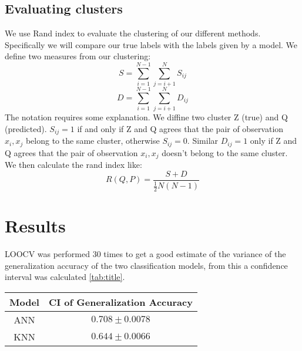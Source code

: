 \documentclass{article}
\begin{document}


\subsection*{Evaluating clusters}
We use Rand index to evaluate the clustering of our different methods. Specifically we will compare our true labels with the labels given by a model.
We define two measures from our clustering:
\begin{equation}
S=\sum_{i=1}^{N-1} \sum_{j=i+1}^{N} S_{i j}
\end{equation}
\begin{equation}
D=\sum_{i=1}^{N-1} \sum_{j=i+1}^{N} D_{i j}
\end{equation}
The notation requires some explanation. We diffine two cluster Z (true) and Q (predicted). $S_{ij} = 1$ if and only if  Z and Q agrees that the pair of observation ${x_i,x_j}$ belong to the same cluster, otherwise $S_{ij} = 0$. Similar  $D_{ij} = 1$ only if Z and Q agrees that the pair of observation ${x_i,x_j}$ doesn't belong to the same cluster. 
We then calculate the rand index like:
\begin{equation}
R(Q, P)=\frac{S+D}{\frac{1}{2} N(N-1)}
\end{equation}

\section{Results}
LOOCV was performed 30 times to get a good estimate of the variance of the generalization accuracy of the two classification models, from this a confidence interval was calculated \ref{tab:title}.

\begin{minipage}{\linewidth}
\centering
{} 
\begin{tabular}{ c c}\toprule[1.5pt]
\bf Model  & \bf CI of Generalization Accuracy \\\midrule
ANN  & $0.708 \pm 0.0078$  \\\midrule
KNN  & $0.644 \pm 0.0066$ \\
\bottomrule[1.25pt]
\end {tabular}\par
\label{tab:title}
\end{minipage} \bigskip
\end{document}
